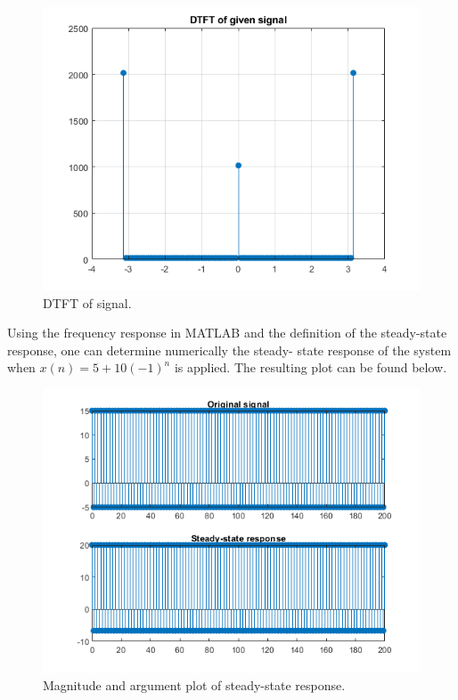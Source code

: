 \documentclass{article}
\begin{document}
\begin{figure}[H]
    \centering
    \includegraphics[width=\textwidth]{"Images/3-18 Fig1"}
    \caption{DTFT of signal.}
    \label{plot:3.18.1}
\end{figure}

Using the frequency response in MATLAB and the definition of the
steady-state response, one can determine numerically the steady-%
state response of the system when \(x(n) = 5+10(-1)^n\) is
applied. The resulting plot can be found below.

\begin{figure}[H]
    \centering
    \includegraphics[width=\textwidth]{"Images/3-18 Fig2"}
    \caption{Magnitude and argument plot of steady-state response.}
    \label{plot:3.18.1.5}
\end{figure}
\end{document}
